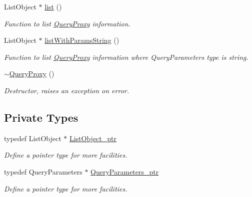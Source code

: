 \begin{DoxyCompactItemize}
ListObject $\ast$ \hyperlink{classQueryProxy_a23e516962073ad50a0375ff3c38cb77a}{list} ()
\begin{DoxyCompactList}\small\item\em Function to list \hyperlink{classQueryProxy}{QueryProxy} information. \item\end{DoxyCompactList}\item 
ListObject $\ast$ \hyperlink{classQueryProxy_ab6debbf7fbc67c4928c16b4ed4d94be8}{listWithParamsString} ()
\begin{DoxyCompactList}\small\item\em Function to list \hyperlink{classQueryProxy}{QueryProxy} information where QueryParameters type is string. \item\end{DoxyCompactList}\item 
\hypertarget{classQueryProxy_a318cd724c4bf2f2cc3103f9dc788bd7b}{
\hyperlink{classQueryProxy_a318cd724c4bf2f2cc3103f9dc788bd7b}{$\sim$QueryProxy} ()}
\label{classQueryProxy_a318cd724c4bf2f2cc3103f9dc788bd7b}

\begin{DoxyCompactList}\small\item\em Destructor, raises an exception on error. \item\end{DoxyCompactList}\end{DoxyCompactItemize}
\subsection*{Private Types}
\begin{DoxyCompactItemize}
\item 
\hypertarget{classQueryProxy_a2ed29ef6f2e7de15a59c3fc9e48dcd76}{
typedef ListObject $\ast$ \hyperlink{classQueryProxy_a2ed29ef6f2e7de15a59c3fc9e48dcd76}{ListObject\_\-ptr}}
\label{classQueryProxy_a2ed29ef6f2e7de15a59c3fc9e48dcd76}

\begin{DoxyCompactList}\small\item\em Define a pointer type for more facilities. \item\end{DoxyCompactList}\item 
\hypertarget{classQueryProxy_a92bffb52502dff5376c6f5760920866b}{
typedef QueryParameters $\ast$ \hyperlink{classQueryProxy_a92bffb52502dff5376c6f5760920866b}{QueryParameters\_\-ptr}}
\label{classQueryProxy_a92bffb52502dff5376c6f5760920866b}

\begin{DoxyCompactList}\small\item\em Define a pointer type for more facilities. \item\end{DoxyCompactList}\end{DoxyCompactItemize}
